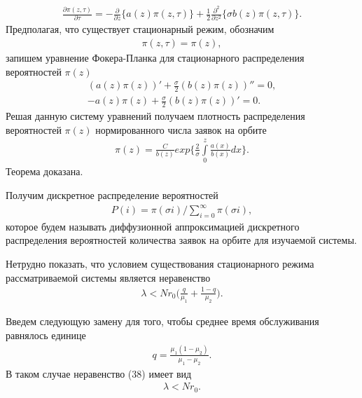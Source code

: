 \begin{align}
	\frac{\partial \pi (z,\tau)}{\partial \tau}=-\frac{\partial}{\partial z}\{a(z)\pi(z,\tau)\} 
	+\frac{1}{2}\frac{\partial^2}{\partial z^2}\{\sigma b(z)\pi(z,\tau)\}.
\end{align}
Предполагая, что существует стационарный режим, обозначим 
\begin{align}
	\pi (z,\tau)=\pi(z),
\end{align}
запишем уравнение Фокера-Планка для стационарного распределения вероятностей $\pi{(z)}$
\begin{align*}
	(a(z)\pi(z))'+\frac{\sigma}{2}(b(z)\pi(z))''=0,\\
	-a(z)\pi(z)+\frac{\sigma}{2}(b(z)\pi(z))'=0.
\end{align*}
Решая данную систему уравнений получаем плотность распределения вероятностей $\pi{(z)}$ нормированного числа заявок на орбите
\begin{align}
	\pi (z)= \frac{C}{b(z)}exp\bigg\{\frac{2}{\sigma} \int\limits_0^z \frac{a(x)}{b(x)}dx\bigg\}.
\end{align} 
Теорема доказана.

Получим дискретное распределение вероятностей
\begin{align}
	P(i)=\pi(\sigma i)/\sum\limits_{i=0}^{\infty} \pi(\sigma i),
\end{align} 
которое будем называть диффузионной аппроксимацией дискретного распределения вероятностей количества заявок на орбите для изучаемой системы.


Нетрудно показать, что условием существования стационарного
режима рассматриваемой системы является неравенство 
\begin{align}
	\lambda<Nr_{0}\bigg(\frac{q}{\mu_{1}}+\frac{1-q}{\mu_{2}}\bigg).
\end{align}

Введем следующую замену для того, чтобы среднее время обслуживания равнялось единице
\begin{align*}
	q=\frac{\mu_{1}(1-\mu_{2})}{\mu_{1}-\mu_{2}}.
\end{align*}
В таком случае неравенство (38) имеет вид
\begin{align*}
	\lambda<Nr_{0}.
\end{align*}